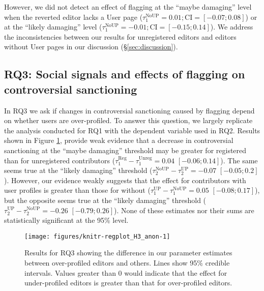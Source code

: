 \documentclass[format=acmsmall, natbib=true,  screen=true]{acmart}
\begin{document}
However, we did not detect an effect of flagging at the ``maybe damaging'' level when the reverted editor lacks a User page ($\tau^{\mathrm{NoUP}}_{1}=0.01;\mathrm{CI}=[-0.07;\allowbreak 0.08]$) or at the ``likely damaging'' level ($\tau^{\mathrm{NoUP}}_{1}=-0.01;\mathrm{CI}=[-0.15;\allowbreak 0.14]$). We address the inconsistencies between our results for unregistered editors and editors without User pages in our discussion (§\ref{sec:discussion}).


\subsection{RQ3: Social signals and effects of flagging on controversial sanctioning }
\label{sec:results-rq3}

In RQ3 we ask if changes in controversial sanctioning caused by flagging depend on whether users are over-profiled. To answer this question, we largely replicate the analysis conducted for RQ1 with the dependent variable used in RQ2. Results shown in Figure \ref{fig:h3.reg.plot}, provide weak evidence that a decrease in controversial sanctioning at the ``maybe damaging'' threshold may be greater for 
registered than for unregistered contributors ($\tau^{\mathrm{Reg}}_1 - \tau^{\mathrm{Unreg}}_1 = 0.04$ $[-0.06;\allowbreak 0.14]$). The same seems true at the ``likely damaging'' threshold ($\tau^{\mathrm{NoUP}}_2 - \tau^{\mathrm{UP}}_2 = -0.07$ $[-0.05;\allowbreak 0.2]$). 
However, our evidence weakly suggests that the effect for contributors with user profiles is greater than those for without
($\tau^{\mathrm{UP}}_1 - \tau^{\mathrm{NoUP}}_1 = 0.05$ $[-0.08;\allowbreak 0.17]$), but the opposite seems true at the ``likely damaging'' threshold ($\tau^{\mathrm{UP}}_2 - \tau^{\mathrm{NoUP}}_2 = -0.26$ $[-0.79;\allowbreak 0.26]$).  None of these estimates nor their sums are statistically significant at the 95\% level.  


\begin{figure}[t]
\centering

\texttt{[image: figures/knitr-regplot\_H3\_anon-1]} 

\caption{Results for RQ3 showing the difference in our parameter estimates between over-profiled editors and others. Lines show 95\% credible intervals. Values greater than 0 would indicate that the effect for under-profiled editors is greater than that for over-profiled editors.}
\label{fig:h3.reg.plot}
\end{figure}                                                                                      
\end{document}
